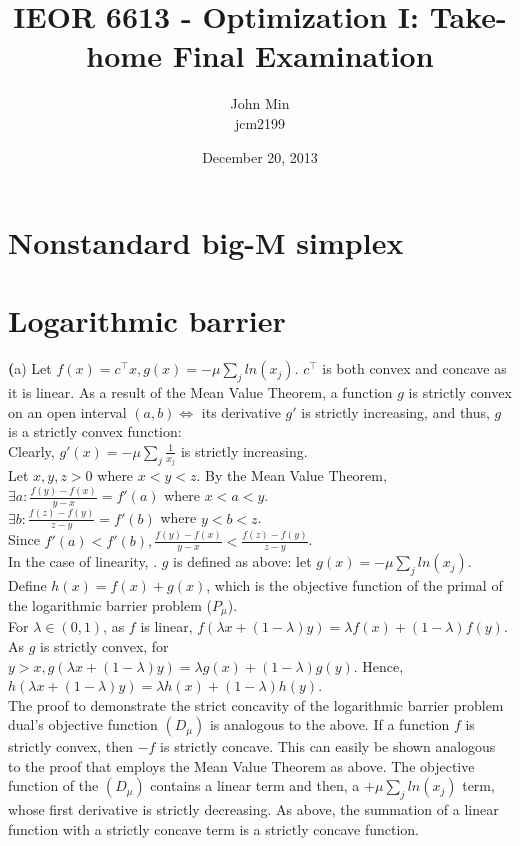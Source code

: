 \documentclass{article}
\begin{document}
\title{IEOR 6613 - Optimization I: Take-home Final Examination}

\author{John Min\\ jcm2199}
\date{December 20, 2013}
\maketitle

\section{Nonstandard big-M simplex}


\section{Logarithmic barrier}

\textbf(a)
Let $f(x) = c^\top x, g(x) = - \mu \sum_j ln(x_j)$.  $c^\top $ is both convex and concave as it is linear.   As a result of the Mean Value Theorem, a function $g$ is strictly convex on an open interval $(a,b) \Leftrightarrow$ its derivative $g'$ is strictly increasing, and thus, $g$ is a strictly convex function: \\

\noindent
Clearly, $g'(x) = -\mu \sum_j  \frac{1}{x_j}$ is strictly increasing.\\

\noindent
Let $x,y,z > 0$ where $x < y < z$.  By the Mean Value Theorem, \\
$\exists a : \frac{f(y) - f(x)}{y - x} = f'(a)$ where $x < a < y$. \\
$ \exists b: \frac{f(z) - f(y)}{z - y} = f'(b)$ where $y < b < z$. \\

\noindent
Since $f'(a) < f'(b), \frac{f(y) - f(x)}{y - x} < \frac{f(z) - f(y)}{z - y}$. \\

\noindent
In the case of linearity, .
$g$ is defined as above:  let $g(x) = - \mu \sum_j ln(x_j)$.  Define $h(x) = f(x) + g(x)$, which is the objective function of the primal of the logarithmic barrier problem ($P_\mu$).  \\

\noindent
For $\lambda \in (0,1)$, as $f$ is linear, $f(\lambda x + (1-\lambda) y) = \lambda f(x) + (1-\lambda) f(y)$.  As $g$ is strictly convex, for $y > x, g(\lambda x + (1-\lambda) y) = \lambda g(x) + (1-\lambda) g(y)$.  Hence, $h(\lambda x + (1-\lambda) y) = \lambda h(x) + (1-\lambda) h(y)$. \\

\noindent 
The proof to demonstrate the strict concavity of the logarithmic barrier problem dual's objective function $(D_\mu)$ is analogous to the above.  If a function $f$ is strictly convex, then $-f$ is strictly concave.  This can easily be shown analogous to the proof that employs the Mean Value Theorem as above.  The objective function of the $(D_\mu)$ contains a linear term and then, a $+ \mu \sum_j ln(x_j)$ term, whose first derivative is strictly decreasing.  As above, the summation of a linear function with a strictly concave term is a strictly concave function. \\
\end{document}
